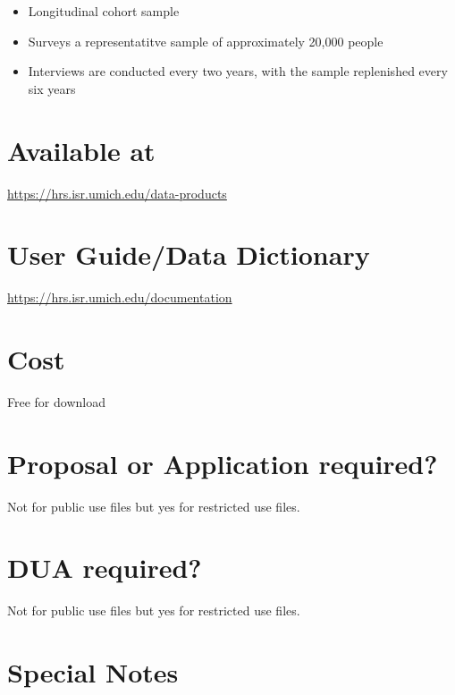 \documentclass[
]{book}
\providecommand{\tightlist}{%
  \setlength{\itemsep}{0pt}\setlength{\parskip}{0pt}}
\begin{document}
\begin{itemize}
\tightlist
\item
  Longitudinal cohort sample
\item
  Surveys a representatitve sample of approximately 20,000 people
\item
  Interviews are conducted every two years, with the sample replenished every six years
\end{itemize}

\hypertarget{available-at-29}{%
\section{Available at}\label{available-at-29}}

\url{https://hrs.isr.umich.edu/data-products}

\hypertarget{user-guidedata-dictionary-29}{%
\section{User Guide/Data Dictionary}\label{user-guidedata-dictionary-29}}

\url{https://hrs.isr.umich.edu/documentation}

\hypertarget{cost-29}{%
\section{Cost}\label{cost-29}}

Free for download

\hypertarget{proposal-or-application-required-29}{%
\section{Proposal or Application required?}\label{proposal-or-application-required-29}}

Not for public use files but yes for restricted use files.

\hypertarget{dua-required-29}{%
\section{DUA required?}\label{dua-required-29}}

Not for public use files but yes for restricted use files.

\hypertarget{special-notes-29}{%
\section{Special Notes}\label{special-notes-29}}
\end{document}
